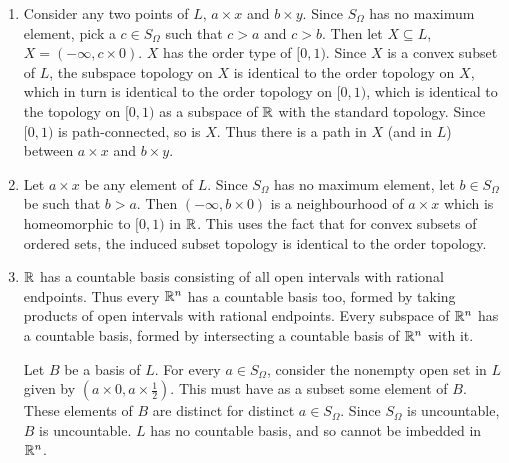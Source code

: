 \begin{enumerate}
\item Consider any two points of $L$, $a \times x$ and $b \times y$. Since $S_\Omega$ has no maximum element, pick a $c \in S_\Omega$ such that $c > a$ and $c > b$. Then let $X \subseteq L$, $X = (-\infty, c \times 0)$. $X$ has the order type of $[0,1)$. Since $X$ is a convex subset of $L$, the subspace topology on $X$ is identical to the order topology on $X$, which in turn is identical to the order topology on $[0,1)$, which is identical to the topology on $[0,1)$ as a subspace of $\mathbb R$ with the standard topology. Since $[0,1)$ is path-connected, so is $X$. Thus there is a path in $X$ (and in $L$) between $a \times x$ and $b \times y$.

\item Let $a \times x$ be any element of $L$. Since $S_\Omega$ has no maximum element, let $b \in S_\Omega$ be such that $b > a$. Then $(-\infty, b \times 0)$ is a neighbourhood of $a \times x$ which is homeomorphic to $[0,1)$ in $\mathbb R$. This uses the fact that for convex subsets of ordered sets, the induced subset topology is identical to the order topology.

\item $\mathbb R$ has a countable basis consisting of all open intervals with rational endpoints. Thus every $\mathbb R^n$ has a countable basis too, formed by taking products of open intervals with rational endpoints. Every subspace of $\mathbb R^n$ has a countable basis, formed by intersecting a countable basis of $\mathbb R^n$ with it.

Let $B$ be a basis of $L$. For every $a \in S_\Omega$, consider the nonempty open set in $L$ given by $(a \times 0, a \times \frac12)$. This must have as a subset some element of $B$. These elements of $B$ are distinct for distinct $a \in S_\Omega$. Since $S_\Omega$ is uncountable, $B$ is uncountable. $L$ has no countable basis, and so cannot be imbedded in $\mathbb R^n$.
\end{enumerate}

